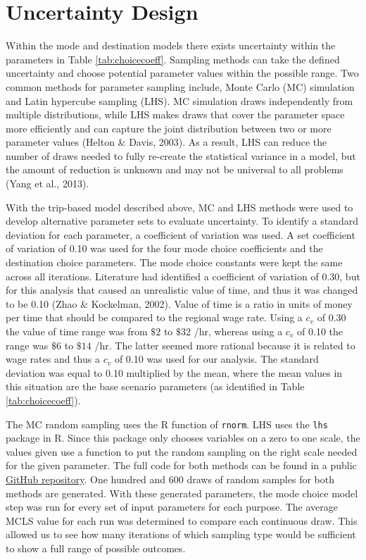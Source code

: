 \documentclass[fancy, masters, twoside]{byuthesis}
\begin{document}
\hypertarget{uncertainty-design}{%
\section{Uncertainty Design}\label{uncertainty-design}}

Within the mode and destination models there exists uncertainty within the parameters in Table \ref{tab:choicecoeff}. Sampling methods can take the defined uncertainty and choose potential parameter values within the possible range. Two common methods for parameter sampling include, Monte Carlo (MC) simulation and Latin hypercube sampling (LHS). MC simulation draws independently from multiple distributions, while LHS makes draws that cover the parameter space more efficiently and can capture the joint distribution between two or more parameter values (Helton \& Davis, 2003). As a result, LHS can reduce the number of draws needed to fully re-create the statistical variance in a model, but the amount of reduction is unknown and may not be universal to all problems (Yang et al., 2013).

With the trip-based model described above, MC and LHS methods were used to develop alternative parameter sets to evaluate uncertainty. To identify a standard deviation for each parameter, a coefficient of variation was used. A set coefficient of variation of 0.10 was used for the four mode choice coefficients and the destination choice parameters. The mode choice constants were kept the same across all iterations. Literature had identified a coefficient of variation of 0.30, but for this analysis that caused an unrealistic value of time, and thus it was changed to be 0.10 (Zhao \& Kockelman, 2002). Value of time is a ratio in units of money per time that should be compared to the regional wage rate. Using a \(c_v\) of 0.30 the value of time range was from \(\$2\) to \(\$32\) /hr, whereas using a \(c_v\) of 0.10 the range was \(\$6\) to \(\$14\) /hr. The latter seemed more rational because it is related to wage rates and thus a \(c_v\) of 0.10 was used for our analysis. The standard deviation was equal to 0.10 multiplied by the mean, where the mean values in this situation are the base scenario parameters (as identified in Table \ref{tab:choicecoeff}).

The MC random sampling uses the R function of \texttt{rnorm}. LHS uses the \texttt{lhs} package in R. Since this package only chooses variables on a zero to one scale, the values given use a function to put the random sampling on the right scale needed for the given parameter. The full code for both methods can be found in a public \href{https://github.com/natmaegray/sensitivity_thesis}{GitHub repository}. One hundred and 600 draws of random samples for both methods are generated. With these generated parameters, the mode choice model step was run for every set of input parameters for each purpose. The average MCLS value for each run was determined to compare each continuous draw. This allowed us to see how many iterations of which sampling type would be sufficient to show a full range of possible outcomes.
\end{document}
